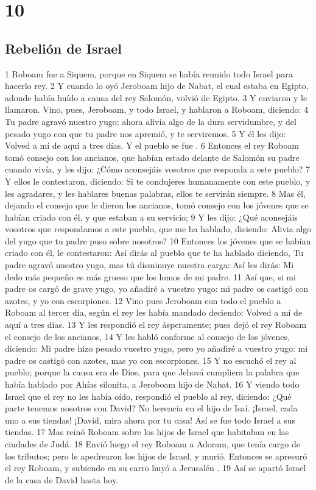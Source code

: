 \chapter{10}

\section*{Rebelión de Israel}

1 Roboam fue a Siquem, porque en Siquem se había reunido todo Israel para hacerlo rey.
2 Y cuando lo oyó Jeroboam hijo de Nabat, el cual estaba en Egipto, adonde había huído a causa del rey Salomón, volvió de Egipto. 
3 Y enviaron y le llamaron. Vino, pues, Jeroboam, y todo Israel, y hablaron a Roboam, diciendo:
4 Tu padre agravó nuestro yugo; ahora alivia algo de la dura servidumbre, y del pesado yugo con que tu padre nos apremió, y te serviremos.
5 Y él les dijo: Volved a mí de aquí a tres días. Y el pueblo se fue .
6 Entonces el rey Roboam tomó consejo con los ancianos, que habían estado delante de Salomón su padre cuando vivía, y les dijo: ¿Cómo aconsejáis vosotros que responda a este pueblo?
7 Y ellos le contestaron, diciendo: Si te condujeres humanamente con este pueblo, y les agradares, y les hablares buenas palabras, ellos te servirán siempre.
8 Mas él, dejando el consejo que le dieron los ancianos, tomó consejo con los jóvenes que se habían criado con él, y que estaban a su servicio;
9 Y les dijo: ¿Qué aconsejáis vosotros que respondamos a este pueblo, que me ha hablado, diciendo: Alivia algo del yugo que tu padre puso sobre nosotros?
10 Entonces los jóvenes que se habían criado con él, le contestaron: Así dirás al pueblo que te ha hablado diciendo, Tu padre agravó nuestro yugo, mas tú disminuye nuestra carga: Así les dirás: Mi dedo más pequeño es más grueso que los lomos de mi padre.
11 Así que, si mi padre os cargó de grave yugo,  yo añadiré a vuestro yugo: mi padre os castigó con azotes, y yo con escorpiones.
12 Vino pues Jeroboam con todo el pueblo a Roboam al tercer día, según el rey les había mandado deciendo: Volved a mí de aquí a tres días.
13 Y les respondió el rey ásperamente; pues dejó el rey Roboam el consejo de los ancianos,
14 Y les habló conforme al consejo de los jóvenes, diciendo: Mi padre hizo pesado vuestro yugo, pero yo añadiré a vuestro yugo: mi padre os castigó con azotes, mas yo con escorpiones.
15 Y no escuchó el rey al pueblo; porque la causa era de Dios, para que Jehová cumpliera la palabra que había hablado por Ahías silonita, a Jeroboam hijo de Nabat.
16 Y viendo todo Israel que el rey no les había oído, respondió el pueblo al rey, diciendo: ¿Qué parte tenemos nosotros con David? No herencia en el hijo de Isaí. ¡Israel, cada uno a sus tiendas! ¡David, mira ahora por tu casa! Así se fue todo Israel a sus tiendas.
17 Mas reinó Roboam sobre los hijos de Israel que habitaban en las ciudades de Judá.
18 Envió luego el rey Roboam a Adoram, que tenía cargo de los tributos; pero le apedrearon los hijos de Israel, y murió. Entonces se apresuró el rey Roboam, y subiendo en su carro huyó a Jerusalén .
19 Así se apartó Israel de la casa de David hasta hoy.

